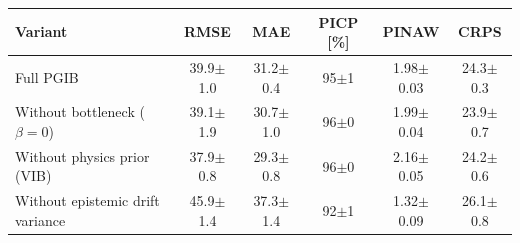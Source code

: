 \begin{tabular}{l c c c c c}
\hline
Variant & RMSE & MAE & PICP [\%] & PINAW & CRPS \\
\hline
Full PGIB & 39.9$\pm$1.0 & 31.2$\pm$0.4 & 95$\pm$1 & 1.98$\pm$0.03 & 24.3$\pm$0.3 \\
Without bottleneck ($\beta=0$) & 39.1$\pm$1.9 & 30.7$\pm$1.0 & 96$\pm$0 & 1.99$\pm$0.04 & 23.9$\pm$0.7 \\
Without physics prior (VIB) & 37.9$\pm$0.8 & 29.3$\pm$0.8 & 96$\pm$0 & 2.16$\pm$0.05 & 24.2$\pm$0.6 \\
Without epistemic drift variance & 45.9$\pm$1.4 & 37.3$\pm$1.4 & 92$\pm$1 & 1.32$\pm$0.09 & 26.1$\pm$0.8 \\
\hline
\end{tabular}
